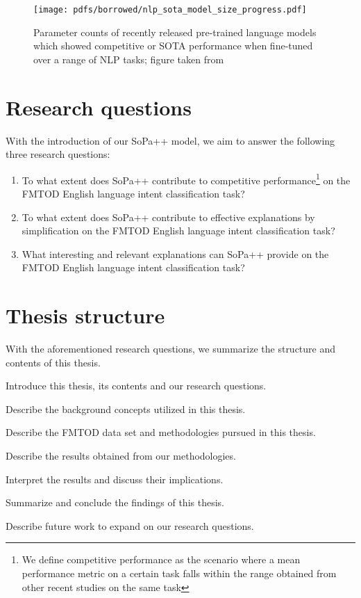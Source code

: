 \begin{figure}[th]
  \centering
  \texttt{[image: pdfs/borrowed/nlp\_sota\_model\_size\_progress.pdf]}
  \caption{Parameter counts of recently released pre-trained language models
    which showed competitive or SOTA performance when fine-tuned over a range of
    NLP tasks; figure taken from \citet{sanh2019distilbert}}
  \label{fig:nlp_progress}
\end{figure}

\section{Research questions}

With the introduction of our SoPa++ model, we aim to answer the following three
research questions:

\begin{enumerate}
  \item To what extent does SoPa++ contribute to competitive
  performance\footnote{We define competitive performance as the scenario where a
    mean performance metric on a certain task falls within the range
    obtained from other recent studies on the same task} on the FMTOD
  English language intent classification task?
  \item To what extent does SoPa++ contribute to effective explanations by
  simplification on the FMTOD English language intent classification task?
  \item What interesting and relevant explanations can SoPa++ provide on the
  FMTOD English language intent classification task?
\end{enumerate}

\section{Thesis structure}

With the aforementioned research questions, we summarize the structure and
contents of this thesis.

\begin{description}[align=left]
  \item [Chapter \ref{chapter:introduction}:] Introduce this thesis, its
  contents and our research questions.
  \item [Chapter \ref{chapter:background}:] Describe the background concepts
  utilized in this thesis.
  \item [Chapter \ref{chapter:methodologies}:] Describe the FMTOD data set and
  methodologies pursued in this thesis.
  \item [Chapter \ref{chapter:results}:] Describe the results obtained from our
  methodologies.
  \item [Chapter \ref{chapter:discussion}:] Interpret the results and discuss their
  implications.
  \item [Chapter \ref{chapter:conclusions}:] Summarize and conclude the findings
  of this thesis.
  \item [Chapter \ref{chapter:further_work}:] Describe future work to expand on
  our research questions.
\end{description}



